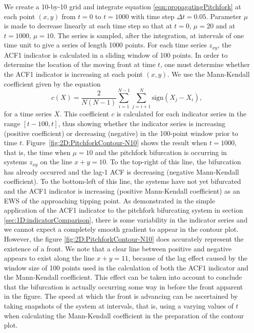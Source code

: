 We create a 10-by-10 grid and integrate equation \ref{eqn:propagatingPitchfork} at each point $(x,y)$ from $t=0$ to $t=1000$ with time step $\Delta t = 0.05$. Parameter $\mu$ is made to decrease linearly at each time step so that at $t=0$, $\mu = 20$ and at $t=1000$, $\mu=10$. The series is sampled, after the integration, at intervals of one time unit to give a series of length 1000 points. For each time series $z_{xy}$, the ACF1 indicator is calculated in a sliding window of 100 points. In order to determine the location of the moving front at time $t$, one must determine whether the ACF1 indicator is increasing at each point $(x,y)$. We use the Mann-Kendall coefficient given by the equation
	\begin{equation}
		\label{eqn:2D:KendallCoef} 
		c(X) = \frac{2}{N(N-1)}\sum_{i=1}^{N-1}\sum_{j=i+1}^{N}\text{sign}(X_j-X_i),
	\end{equation}
for a time series $X$. This coefficient $c$ is calculated for each indicator series in the range $[t-100, t]$, thus showing whether the indicator series is increasing (positive coefficient) or decreasing (negative) in the 100-point window prior to time $t$. Figure~\ref{fig:2D:PitchforkContour-N10} shows the result when $t=1000$, that is, the time when $\mu=10$ and the pitchfork bifurcation is occurring in systems $z_{xy}$ on the line $x+y=10$. To the top-right of this line, the bifurcation has already occurred and the lag-1 ACF is decreasing (negative Mann-Kendall coefficient). To the bottom-left of this line, the systems have not yet bifurcated and the ACF1 indicator is increasing (positive Mann-Kendall coefficient) as an EWS of the approaching tipping point. As demonstrated in the simple application of the ACF1 indicator to the pitchfork bifurcating system in section \ref{sec:1D:indicatorComparison}, there is some variability in the indicator series and we cannot expect a completely smooth gradient to appear in the contour plot. However, the figure \ref{fig:2D:PitchforkContour-N10} does accurately represent the existence of a front. We note that a clear line between positive and negative appears to exist along the line $x+y =11$, because of the lag effect caused by the window size of 100 points used in the calculation of both the ACF1 indicator and the Mann-Kendall coefficient. This effect can be taken into account to conclude that the bifurcation is actually occurring some way in before the front apparent in the figure. The speed at which the front is advancing can be ascertained by taking snapshots of the system at intervals, that is, using a varying values of $t$ when calculating the Mann-Kendall coefficient in the preparation of the contour plot.
